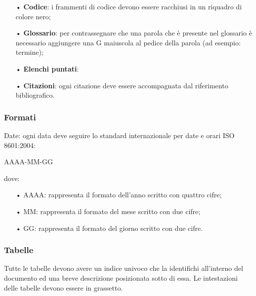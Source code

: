 \begin{itemize}
\item[•] \textbf{Codice}: i frammenti di codice devono essere racchiusi in un riquadro di colore nero;
\item[•] \textbf{Glossario}: per contrassegnare che una parola che è presente nel glossario è necessario aggiungere una G maiuscola al pedice della parola (ad esempio: {termine});
\item[•] \textbf{Elenchi puntati}:
\item[•] \textbf{Citazioni}: ogni citazione deve essere accompagnata dal riferimento bibliografico.
\end{itemize}


\subsubsection{Formati}
Date: ogni data deve seguire lo standard internazionale per date e orari ISO 8601:2004:
\centerline{AAAA-MM-GG}
dove: 
\begin{itemize}
\item[•] AAAA: rappresenta il formato dell’anno scritto con quattro cifre;
\item[•] MM: rappresenta il formato del mese scritto con due cifre;
\item[•] GG: rappresenta il formato del giorno scritto con due cifre.
\end{itemize}


\subsubsection{Tabelle}
Tutte le tabelle devono avere un indice univoco che la identifichi all’interno del documento ed una breve descrizione posizionata sotto di essa. Le intestazioni delle tabelle devono essere in grassetto.

